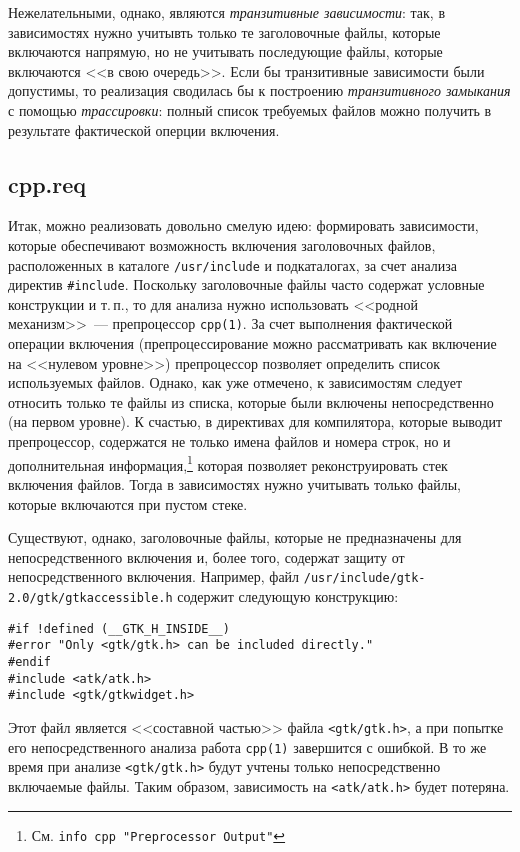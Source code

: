 \documentclass[russian,a4paper,12pt,titlepage]{article}
\begin{document}
Нежелательными, однако, являются \emph{транзитивные зависимости}: так, в зависимостях нужно учитывть
только те заголовочные файлы, которые включаются напрямую, но не учитывать последующие файлы, которые
включаются <<в свою очередь>>.  Если бы транзитивные зависимости были допустимы, то реализация сводилась бы
к построению \emph{транзитивного замыкания} с помощью \emph{трассировки}: полный список требуемых
файлов можно получить в результате фактической оперции включения.

\subsection{cpp.req}
Итак, можно реализовать довольно смелую идею: формировать зависимости, которые обеспечивают возможность включения
заголовочных файлов, расположенных в каталоге \verb|/usr/include| и подкаталогах, за счет анализа директив \verb|#include|.
Поскольку заголовочные файлы часто содержат условные конструкции и т.\,п., то для анализа нужно использовать
<<родной механизм>>~--- препроцессор \verb|cpp(1)|.  За счет выполнения фактической операции включения (препроцессирование
можно рассматривать как включение на <<нулевом уровне>>) препроцессор позволяет определить список используемых файлов.
Однако, как уже отмечено, к зависимостям следует относить только те файлы из списка, которые были включены непосредственно
(на первом уровне).  К счастью, в директивах для компилятора, которые выводит препроцессор, содержатся не только имена файлов
и номера строк, но и дополнительная информация,\footnote{См. \texttt{info cpp "Preprocessor Output"}}
которая позволяет реконструировать стек включения файлов.  Тогда в зависимостях нужно учитывать только файлы,
которые включаются при пустом стеке.

Существуют, однако, заголовочные файлы, которые не предназначены для непосредственного включения и, более того, содержат защиту
от непосредственного включения.  Например, файл \texttt{/usr/include/gtk-2.0/gtk/gtkaccessible.h} содержит следующую
конструкцию:
\begin{verbatim}
#if !defined (__GTK_H_INSIDE__)
#error "Only <gtk/gtk.h> can be included directly."
#endif
#include <atk/atk.h>
#include <gtk/gtkwidget.h>
\end{verbatim}
Этот файл является <<составной частью>> файла \verb|<gtk/gtk.h>|, а при попытке его непосредственного анализа
работа \verb|cpp(1)| завершится с ошибкой.  В то же время при анализе \verb|<gtk/gtk.h>| будут учтены только
непосредственно включаемые файлы.  Таким образом, зависимость на \verb|<atk/atk.h>| будет потеряна.
\end{document}
